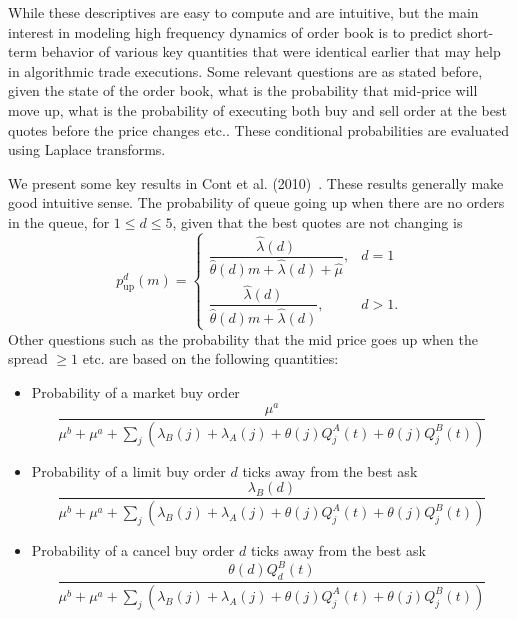While these descriptives are easy to compute and are intuitive, but the main interest in modeling high frequency dynamics of order book is to predict short-term behavior of various key quantities that were identical earlier that may help in algorithmic trade executions. Some relevant questions are as stated before, given the state of the order book, what is the probability that mid-price will move up, what is the probability of executing both buy and sell order at the best quotes before the price changes etc.. These conditional probabilities are evaluated using Laplace transforms.


We present some key results in Cont et al. (2010)~\cite{contstoi}. These results generally make good intuitive sense. The probability of queue going up when there are no orders in the queue, for $1 \leq d \leq 5$, given that the best quotes are not changing is
	\begin{equation}\label{eqn:queuecon}
	p_{\text{up}}^d(m)=
	\begin{cases}
	\dfrac{\hat{\lambda}(d)}{\hat{\theta}(d)m + \hat{\lambda}(d) + \hat{\mu}}, & d=1 \\
	\dfrac{\hat{\lambda}(d)}{\hat{\theta}(d)m + \hat{\lambda}(d)}, & d>1.
	\end{cases}
	\end{equation}
Other questions such as the probability that the mid price goes up when the spread $\geq 1$ etc. are based on the following quantities:
	\begin{itemize}
	\item Probability of a market buy order
		\begin{equation}\label{eqn:probmarketbuy}
		\dfrac{\mu^a}{\mu^b+\mu^a+\sum_j (\lambda_B(j)+\lambda_A(j)+\theta(j) Q_j^A(t)+\theta(j)Q_j^B(t))}
		\end{equation}
	\item Probability of a limit buy order $d$ ticks away from the best ask
		\begin{equation}\label{eqn:problimitbuytick}
		\dfrac{\lambda_B(d)}{\mu^b+\mu^a+\sum_j(\lambda_B(j)+\lambda_A(j)+\theta(j)Q_j^A(t)+\theta(j)Q_j^B(t))}
		\end{equation}
	\item Probability of a cancel buy order $d$ ticks away from the best ask
		\begin{equation}\label{eqn:probcanceltick}
		\dfrac{\theta(d)Q_d^B(t)}{\mu^b+\mu^a+\sum_j(\lambda_B(j)+\lambda_A(j)+\theta(j)Q_j^A(t)+\theta(j)Q_j^B(t))}
		\end{equation}
	\end{itemize}
